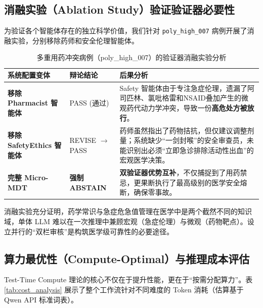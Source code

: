 \documentclass[11pt,a4paper]{ctexart}
\begin{document}
\subsection{消融实验（Ablation Study）验证验证器必要性}

为验证各个智能体存在的独立科学价值，我们针对 \texttt{poly\_high\_007} 病例开展了消融实验，分别移除药师和安全伦理智能体。

\begin{table}[H]
\centering
\caption{多重用药冲突病例（poly\_high\_007）的验证器消融实验分析}
\label{tab:ablation}
\small
\begin{tabular}{p{3.5cm} p{3.5cm} p{7.5cm}}
\toprule
\textbf{系统配置变体} & \textbf{辩论结论} & \textbf{后果分析} \\
\midrule
\textbf{移除 Pharmacist 智能体} & PASS (通过) & Safety 智能体由于专注急症伦理，遗漏了阿司匹林、氯吡格雷和NSAID叠加产生的微观药代动力学冲突，导致一份\textbf{高危处方被放行}。 \\
\midrule
\textbf{移除 SafetyEthics 智能体} & REVISE $\rightarrow$ PASS & 药师虽然指出了药物拮抗，但仅建议调整剂量；系统缺少“一剑封喉”的安全审查员，未能识别出必须“立即急诊排除活动性出血”的宏观医学决策。 \\
\midrule
\textbf{完整 Micro-MDT} & \textbf{强制 ABSTAIN} & \textbf{双验证器优势互补}，不仅捕捉到了用药禁忌，更果断执行了最高级别的医学安全熔断，确保零事故。 \\
\bottomrule
\end{tabular}
\end{table}

消融实验充分证明，药学常识与急症危急值管理在医学中是两个截然不同的知识域，单体 LLM 难以在一次推理中兼顾宏观（急症伦理）与微观（药物靶点）。设立并行的“双栏审核”是构筑医学级可靠性的必要途径。

\subsection{算力最优性（Compute-Optimal）与推理成本评估}

Test-Time Compute 理论的核心不仅在于提升性能，更在于“按需分配算力”。表 \ref{tab:cost_analysis} 展示了整个工作流针对不同难度的 Token 消耗（估算基于 Qwen API 标准词表）。
\end{document}
